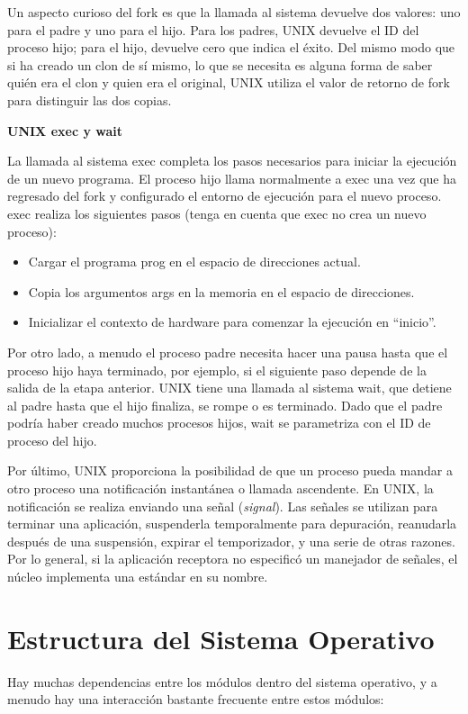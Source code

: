 \documentclass[10pt]{book}
\begin{document}
Un aspecto curioso del {\mf fork} es que la llamada al sistema devuelve dos valores: uno para el padre y uno para el hijo. Para los padres, UNIX devuelve el ID del proceso hijo; para el hijo, devuelve cero que indica el éxito. Del mismo modo que si ha creado un clon de sí mismo, lo que se necesita es alguna forma de saber quién era el clon y quien era el original, UNIX utiliza el valor de retorno de {\mf fork} para distinguir las dos copias.

\textbf{UNIX {\mf exec} y {\mf wait}}

La llamada al sistema {\mf exec} completa los pasos necesarios para iniciar la ejecución de un nuevo programa. El proceso hijo llama normalmente a {\mf exec} una vez que ha regresado del {\mf fork} y configurado el entorno de ejecución para el nuevo proceso. {\mf exec} realiza los siguientes pasos (tenga en cuenta que {\mf exec} no crea un nuevo proceso):
\begin{itemize}
\item Cargar el programa {\mf prog} en el espacio de direcciones actual.
\item Copia los argumentos {\mf args} en la memoria en el espacio de direcciones.
\item Inicializar el contexto de hardware para comenzar la ejecución en ``inicio''.
\end{itemize}

Por otro lado, a menudo el proceso padre necesita hacer una pausa hasta que el proceso hijo haya terminado, por ejemplo, si el siguiente paso depende de la salida de la etapa anterior. UNIX tiene una llamada al sistema {\mf wait}, que detiene al padre hasta que el hijo finaliza, se rompe o es terminado. Dado que el padre podría haber creado muchos procesos hijos, {\mf wait} se parametriza con el ID de proceso del hijo.

Por último, UNIX proporciona la posibilidad de que un proceso pueda mandar a otro proceso una notificación instantánea o llamada ascendente. En UNIX, la notificación se realiza enviando una señal (\textit{signal}). Las señales se utilizan para terminar una aplicación, suspenderla temporalmente para depuración, reanudarla después de una suspensión, expirar el temporizador, y una serie de otras razones. Por lo general, si la aplicación receptora no especificó un manejador de señales, el núcleo implementa una estándar en su nombre.

\section{Estructura del Sistema Operativo}
Hay muchas dependencias entre los módulos dentro del sistema operativo, y a menudo hay una interacción bastante frecuente entre estos módulos:
\end{document}
